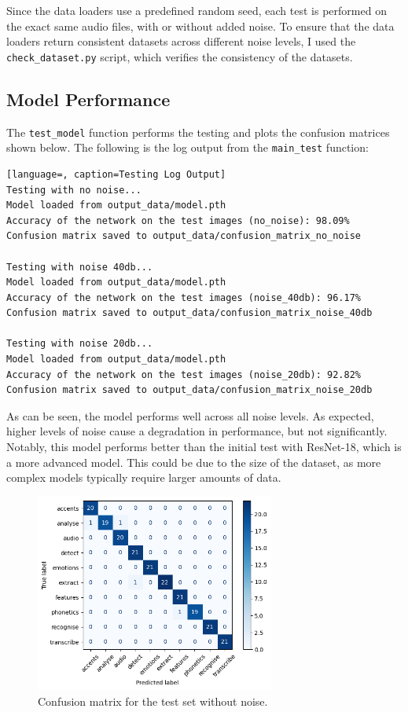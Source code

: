 \documentclass[12pt]{article}
\begin{document}
Since the data loaders use a predefined random seed, each test is performed on the exact same audio files, with or without added noise. To ensure that the data loaders return consistent datasets across different noise levels, I used the \texttt{check\_dataset.py} script, which verifies the consistency of the datasets.

\subsection{Model Performance}

The \texttt{test\_model} function performs the testing and plots the confusion matrices shown below. The following is the log output from the \texttt{main\_test} function:

\begin{lstlisting}[language=, caption=Testing Log Output]
Testing with no noise...
Model loaded from output_data/model.pth
Accuracy of the network on the test images (no_noise): 98.09%
Confusion matrix saved to output_data/confusion_matrix_no_noise

Testing with noise 40db...
Model loaded from output_data/model.pth
Accuracy of the network on the test images (noise_40db): 96.17%
Confusion matrix saved to output_data/confusion_matrix_noise_40db

Testing with noise 20db...
Model loaded from output_data/model.pth
Accuracy of the network on the test images (noise_20db): 92.82%
Confusion matrix saved to output_data/confusion_matrix_noise_20db
\end{lstlisting}

As can be seen, the model performs well across all noise levels. As expected, higher levels of noise cause a degradation in performance, but not significantly. Notably, this model performs better than the initial test with ResNet-18, which is a more advanced model. This could be due to the size of the dataset, as more complex models typically require larger amounts of data.

\begin{figure}[h]
    \centering
    \includegraphics[width=0.7\textwidth]{confusion_matrix_no_noise.png}
    \caption{Confusion matrix for the test set without noise.}
    \label{fig:confusion_matrix_no_noise}
\end{figure}
\end{document}
